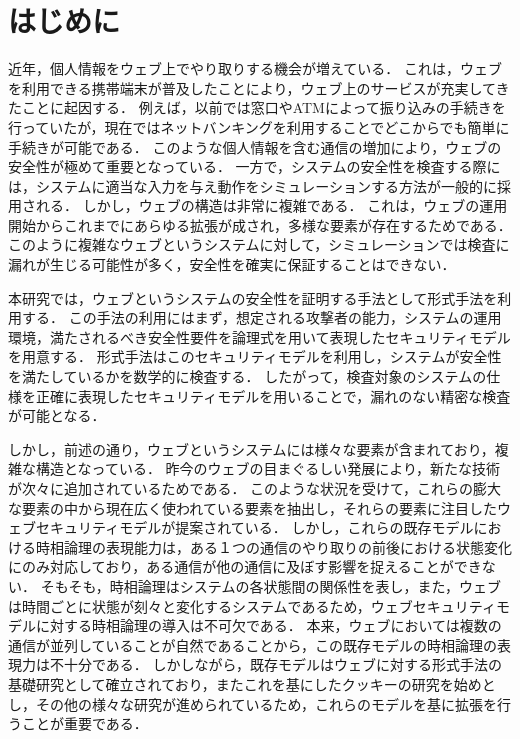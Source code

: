 \documentclass[12pt,a4paper]{jbook}
\begin{document}
\newpage

\chapter{はじめに}
\label{sec:introduction}
近年，個人情報をウェブ上でやり取りする機会が増えている．
これは，ウェブを利用できる携帯端末が普及したことにより，ウェブ上のサービスが充実してきたことに起因する．
例えば，以前では窓口やATMによって振り込みの手続きを行っていたが，現在ではネットバンキングを利用することでどこからでも簡単に手続きが可能である．
このような個人情報を含む通信の増加により，ウェブの安全性が極めて重要となっている．
一方で，システムの安全性を検査する際には，システムに適当な入力を与え動作をシミュレーションする方法が一般的に採用される．
しかし，ウェブの構造は非常に複雑である．
これは，ウェブの運用開始からこれまでにあらゆる拡張が成され，多様な要素が存在するためである．
このように複雑なウェブというシステムに対して，シミュレーションでは検査に漏れが生じる可能性が多く，安全性を確実に保証することはできない．

本研究では，ウェブというシステムの安全性を証明する手法として形式手法を利用する．
この手法の利用にはまず，想定される攻撃者の能力，システムの運用環境，満たされるべき安全性要件を論理式を用いて表現したセキュリティモデルを用意する．
形式手法はこのセキュリティモデルを利用し，システムが安全性を満たしているかを数学的に検査する．
したがって，検査対象のシステムの仕様を正確に表現したセキュリティモデルを用いることで，漏れのない精密な検査が可能となる．

しかし，前述の通り，ウェブというシステムには様々な要素が含まれており，複雑な構造となっている．
昨今のウェブの目まぐるしい発展により，新たな技術が次々に追加されているためである．
このような状況を受けて，これらの膨大な要素の中から現在広く使われている要素を抽出し，それらの要素に注目したウェブセキュリティモデルが提案されている\cite{based-model,cookie-model}．
しかし，これらの既存モデルにおける時相論理の表現能力は，ある１つの通信のやり取りの前後における状態変化にのみ対応しており，ある通信が他の通信に及ぼす影響を捉えることができない．
そもそも，時相論理はシステムの各状態間の関係性を表し，また，ウェブは時間ごとに状態が刻々と変化するシステムであるため，ウェブセキュリティモデルに対する時相論理の導入は不可欠である．
本来，ウェブにおいては複数の通信が並列していることが自然であることから，この既存モデルの時相論理の表現力は不十分である．
しかしながら，既存モデル\cite{based-model}はウェブに対する形式手法の基礎研究として確立されており，またこれを基にしたクッキーの研究\cite{cookie-model}を始めとし，その他の様々な研究\cite{chaitanya2017formal, bagheri2016practical, chen2015aspire, nelson2013aluminum, somorovsky2011all}が進められているため，これらのモデルを基に拡張を行うことが重要である．
\end{document}
